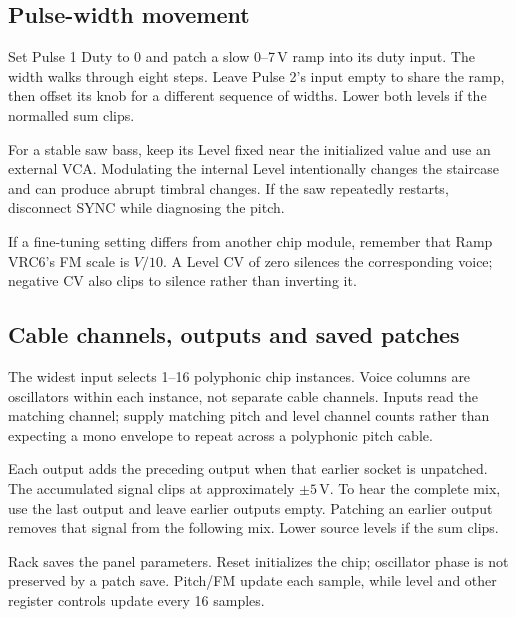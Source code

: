 \subsection{Pulse-width movement}
Set Pulse 1 Duty to 0 and patch a slow 0--7\,V ramp into its duty input.
The width walks through eight steps. Leave Pulse 2's input empty to share
the ramp, then offset its knob for a different sequence of widths. Lower
both levels if the normalled sum clips.

For a stable saw bass, keep its Level fixed near the initialized value and
use an external VCA. Modulating the internal Level intentionally changes
the staircase and can produce abrupt timbral changes. If the saw repeatedly
restarts, disconnect SYNC while diagnosing the pitch.

If a fine-tuning setting differs from another chip module, remember that
Ramp VRC6's FM scale is $V/10$. A Level CV of zero silences the corresponding
voice; negative CV also clips to silence rather than inverting it.

\subsection{Cable channels, outputs and saved patches}
The widest input selects 1--16 polyphonic chip instances. Voice columns are
oscillators within each instance, not separate cable channels. Inputs read
the matching channel; supply matching pitch and level channel counts rather
than expecting a mono envelope to repeat across a polyphonic pitch cable.

Each output adds the preceding output when that earlier socket is unpatched.
The accumulated signal clips at approximately $\pm5$\,V. To hear the complete
mix, use the last output and leave earlier outputs empty. Patching an earlier
output removes that signal from the following mix. Lower source levels if
the sum clips.

Rack saves the panel parameters. Reset initializes the chip; oscillator
phase is not preserved by a patch save. Pitch/FM update each sample, while
level and other register controls update every 16 samples.
